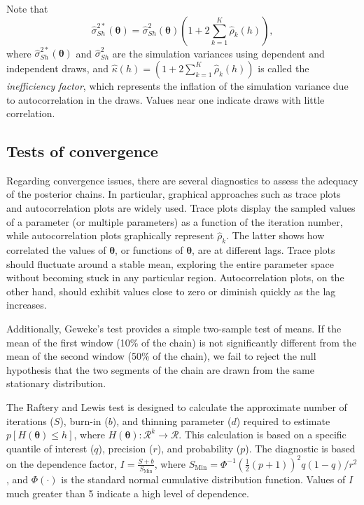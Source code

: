 Note that  
\[  
\hat{\sigma}^{2*}_{Sh}(\bm{\theta}) = \hat{\sigma}^2_{Sh}(\bm{\theta}) (1+2\sum_{k=1}^K \hat{\rho}_k(h)),  
\]  
where $\hat{\sigma}^{2*}_{Sh}(\bm{\theta})$ and $\hat{\sigma}^2_{Sh}$ are the simulation variances using dependent and independent draws, and $\hat{\kappa}(h) = (1+2\sum_{k=1}^K \hat{\rho}_k(h))$ is called the \textit{inefficiency factor}, which represents the inflation of the simulation variance due to autocorrelation in the draws. Values near one indicate draws with little correlation.  

 
\subsection{Tests of convergence}

Regarding convergence issues, there are several diagnostics to assess the adequacy of the posterior chains. In particular, graphical approaches such as trace plots and autocorrelation plots are widely used. Trace plots display the sampled values of a parameter (or multiple parameters) as a function of the iteration number, while autocorrelation plots graphically represent $\hat{\rho}_k$. The latter shows how correlated the values of $\bm{\theta}$, or functions of $\bm{\theta}$, are at different lags. Trace plots should fluctuate around a stable mean, exploring the entire parameter space without becoming stuck in any particular region. Autocorrelation plots, on the other hand, should exhibit values close to zero or diminish quickly as the lag increases.

Additionally, Geweke's test \cite{Geweke1992} provides a simple two-sample test of means. If the mean of the first window (10\% of the chain) is not significantly different from the mean of the second window (50\% of the chain), we fail to reject the null hypothesis that the two segments of the chain are drawn from the same stationary distribution.

The Raftery and Lewis test \cite{Raftery1992} is designed to calculate the approximate number of iterations ($S$), burn-in ($b$), and thinning parameter ($d$) required to estimate $p\left[H(\bm{\theta}) \leq h\right]$, where $H(\bm{\theta}): \mathcal{R}^k \rightarrow \mathcal{R}$. This calculation is based on a specific quantile of interest ($q$), precision ($r$), and probability ($p$). The diagnostic is based on the dependence factor, $I = \frac{S + b}{S_{\text{Min}}}$, where $S_{\text{Min}} = \Phi^{-1}\left(\frac{1}{2}(p+1)\right)^2 q(1-q) / r^2$, and $\Phi(\cdot)$ is the standard normal cumulative distribution function. Values of $I$ much greater than 5 indicate a high level of dependence.

